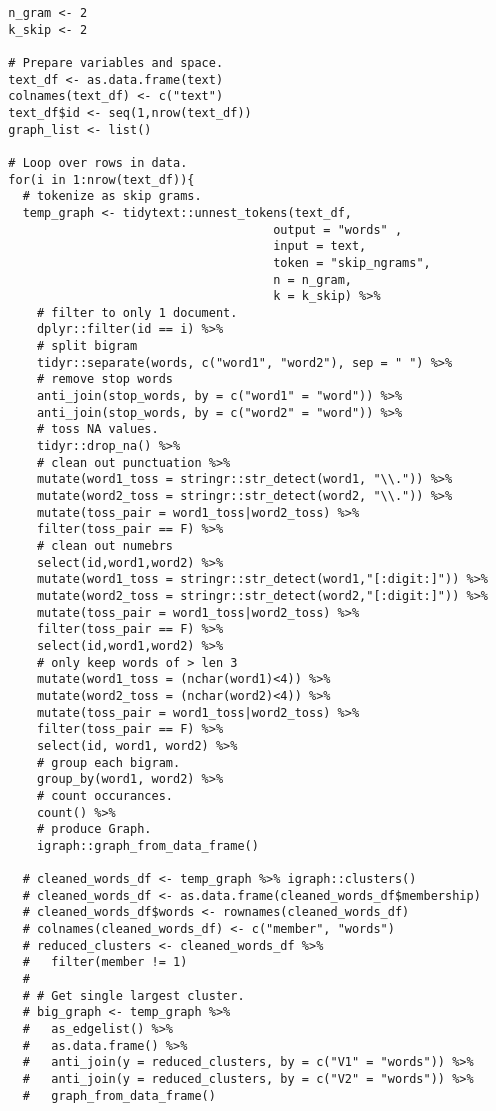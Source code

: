 \begin{appendices}
\begin{lstlisting}
  n_gram <- 2
  k_skip <- 2
  
  # Prepare variables and space.
  text_df <- as.data.frame(text)
  colnames(text_df) <- c("text")
  text_df$id <- seq(1,nrow(text_df))
  graph_list <- list()
  
  # Loop over rows in data.
  for(i in 1:nrow(text_df)){
    # tokenize as skip grams.
    temp_graph <- tidytext::unnest_tokens(text_df, 
                                       output = "words" ,
                                       input = text, 
                                       token = "skip_ngrams",
                                       n = n_gram,
                                       k = k_skip) %>%  
      # filter to only 1 document.
      dplyr::filter(id == i) %>% 
      # split bigram
      tidyr::separate(words, c("word1", "word2"), sep = " ") %>%
      # remove stop words
      anti_join(stop_words, by = c("word1" = "word")) %>% 
      anti_join(stop_words, by = c("word2" = "word")) %>% 
      # toss NA values.
      tidyr::drop_na() %>% 
      # clean out punctuation %>% 
      mutate(word1_toss = stringr::str_detect(word1, "\\.")) %>% 
      mutate(word2_toss = stringr::str_detect(word2, "\\.")) %>% 
      mutate(toss_pair = word1_toss|word2_toss) %>% 
      filter(toss_pair == F) %>% 
      # clean out numebrs
      select(id,word1,word2) %>% 
      mutate(word1_toss = stringr::str_detect(word1,"[:digit:]")) %>% 
      mutate(word2_toss = stringr::str_detect(word2,"[:digit:]")) %>% 
      mutate(toss_pair = word1_toss|word2_toss) %>% 
      filter(toss_pair == F) %>% 
      select(id,word1,word2) %>% 
      # only keep words of > len 3
      mutate(word1_toss = (nchar(word1)<4)) %>% 
      mutate(word2_toss = (nchar(word2)<4)) %>% 
      mutate(toss_pair = word1_toss|word2_toss) %>% 
      filter(toss_pair == F) %>% 
      select(id, word1, word2) %>% 
      # group each bigram.
      group_by(word1, word2) %>% 
      # count occurances.
      count() %>% 
      # produce Graph.
      igraph::graph_from_data_frame()
    
    # cleaned_words_df <- temp_graph %>% igraph::clusters()
    # cleaned_words_df <- as.data.frame(cleaned_words_df$membership)
    # cleaned_words_df$words <- rownames(cleaned_words_df)
    # colnames(cleaned_words_df) <- c("member", "words")
    # reduced_clusters <- cleaned_words_df %>% 
    #   filter(member != 1)
    # 
    # # Get single largest cluster.
    # big_graph <- temp_graph %>% 
    #   as_edgelist() %>% 
    #   as.data.frame() %>% 
    #   anti_join(y = reduced_clusters, by = c("V1" = "words")) %>% 
    #   anti_join(y = reduced_clusters, by = c("V2" = "words")) %>% 
    #   graph_from_data_frame()
    

\end{lstlisting}
\end{appendices}
